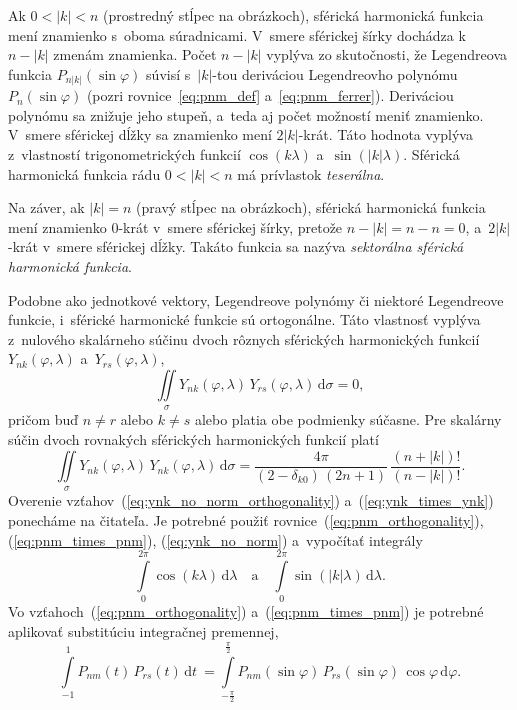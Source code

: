 \documentclass[a4paper,12pt]{book}
\newcommand{\diff}{\mathrm d}
\begin{document}
Ak $0 < |k| < n$ (prostredný stĺpec na obrázkoch), sférická harmonická funkcia
mení znamienko s~oboma súradnicami.  V~smere sférickej šírky dochádza k~$n
- |k|$ zmenám znamienka.  Počet $n - |k|$ vyplýva zo skutočnosti, že
Legendreova funkcia $P_{n|k|}(\sin\varphi)$ súvisí s~$|k|$-tou deriváciou
Legendreovho polynómu $P_n(\sin\varphi)$ (pozri rovnice~\ref{eq:pnm_def}
a~\ref{eq:pnm_ferrer}).  Deriváciou polynómu sa znižuje jeho stupeň, a~teda aj
počet možností meniť znamienko.  V~smere sférickej dĺžky sa znamienko mení
$2|k|$-krát.  Táto hodnota vyplýva z~vlastností trigonometrických funkcií
$\cos(k\lambda)$ a~$\sin(|k|\lambda)$.  Sférická harmonická funkcia rádu $0
< |k| < n$ má prívlastok \emph{teserálna}.

Na záver, ak $|k| = n$ (pravý stĺpec na obrázkoch), sférická harmonická funkcia
mení znamienko $0$-krát v~smere sférickej šírky, pretože $n - |k| = n - n = 0$,
a~$2|k|$-krát v~smere sférickej dĺžky.  Takáto funkcia sa nazýva
\emph{sektorálna sférická harmonická funkcia}.

Podobne ako jednotkové vektory, Legendreove polynómy či niektoré Legendreove
funkcie, i~sférické harmonické funkcie sú ortogonálne.  Táto vlastnosť vyplýva
z~nulového skalárneho súčinu dvoch rôznych sférických harmonických funkcií
$Y_{nk}(\varphi, \lambda)$ a~$Y_{rs}(\varphi, \lambda)$,
%
\begin{equation}
\label{eq:ynk_no_norm_orthogonality}
\iint\limits_{\sigma} Y_{nk}(\varphi, \lambda) \, Y_{rs}(\varphi, \lambda) \, 
\diff \sigma = 0{,}
\end{equation}
%
pričom buď $n \neq r$ alebo $k \neq s$ alebo platia obe podmienky súčasne.  Pre
skalárny súčin dvoch rovnakých sférických harmonických funkcií platí
%
\begin{equation}
\label{eq:ynk_times_ynk}
\iint\limits_{\sigma} Y_{nk}(\varphi, \lambda) \, Y_{nk}(\varphi, \lambda) \, 
\diff \sigma =
%
\dfrac{4\pi}{(2 - \delta_{k0}) \, (2n + 1)} \, \dfrac{(n + |k|)!}{(n
- |k|)!}{.}
\end{equation}
%
Overenie vzťahov~(\ref{eq:ynk_no_norm_orthogonality})
a~(\ref{eq:ynk_times_ynk}) ponecháme na čitateľa.  Je potrebné použiť
rovnice~(\ref{eq:pnm_orthogonality}), (\ref{eq:pnm_times_pnm}),
(\ref{eq:ynk_no_norm}) a~vypočítať integrály
%
\begin{equation}
\int\limits_{0}^{2\pi} \cos(k \lambda) \, \diff\lambda \quad \text{a} \quad
\int\limits_{0}^{2\pi} \sin(|k| \lambda) \, \diff\lambda{.}
\end{equation}
%
Vo vzťahoch~(\ref{eq:pnm_orthogonality}) a~(\ref{eq:pnm_times_pnm}) je potrebné
aplikovať substitúciu integračnej premennej,
%
\begin{equation}
\int\limits_{-1}^{1} P_{nm}(t) \, P_{rs}(t) \, \diff
t~= \int\limits_{-\frac{\pi}{2}}^{\frac{\pi}{2}} P_{nm}(\sin\varphi) \,
P_{rs}(\sin\varphi) \, \cos\varphi \, \diff \varphi{.}
\end{equation}
\end{document}
